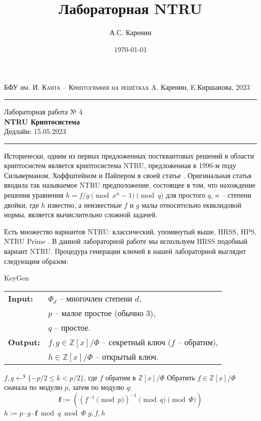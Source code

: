 \documentclass[11pt]{exam}
\author{А.С. Каренин}
\title{Лабораторная NTRU}
\date{\today}
\newcommand{\Z}{\mathbb{Z}}
\begin{document}
	

	
		{\noindent
		\textsc{\small БФУ им. И. Канта -- Криптография на решётках}
		\hfill {A. Каренин, E.Киршанова, 2023}
		\hrule
		\begin{center}
			{\LARGE
				Лабораторная работа № 4 \\[5pt]
				\textbf{
					NTRU Криптосистема
				} \\[10pt]
				{Дедлайн: 15.05.2023} 
			} 
		\end{center}
		\hrule \vspace{5mm}
	
	Исторически, одним из первых предложенных постквантовых решений в области криптосистем является криптосистема NTRU, предложенная в 1996-м поду Сильверманом, Хоффштейном и Пайпером в своей статье \cite{HoffsteinPS98}. Оригинальная статья вводила так называемое NTRU предположение, состоящее в том, что нахождение решения уравнения $h = f/g \pmod{x^n-1} \pmod{q}$ для простого $q$, $n$ -- степени двойки, где $h$ известно, а неизвестные $f$ и $g$ малы относительно еквклидовой нормы, является вычислительно сложной задачей.
	
	Есть множество вариантов NTRU: классический, упомянутый выше, HRSS, HPS, NTRU Prime \cite{schanck2018comparison}. В данной лабораторной работе мы используем HRSS подобный вариант NTRU. Процедура генерации ключей в нашей лабораторной выглядит следующим образом:
	
	  \begin{algorithm}[H] \caption{KeyGen} \label{keygen}
	  	\begin{tabular}{ll}
		\textbf{Input:} & $\Phi_d$  -- многочлен степени $d$,\\
		& $p$ -- малое простое (обычно 3), \\
		& $q$ -- простое.\\
		\textbf{Output:} & $f, g \in \Z[x] / \Phi $ -- секретный ключ ($f$ -- обратим),\\
		& $h \in \Z[x] / \Phi$ -- открытый ключ.
	\end{tabular}
		\begin{algorithmic}[1]
			\State $f, g \leftarrow^\$ \{-p/2 \leqslant k <p/2\}$, где $f$ обратим в $\Z[x] / \Phi $
			\State Обратить $f \in \Z[x]/\Phi$ сначала по модулю $p$, затем по модулю $q$: 
			\[ \mathbf{f} := \left( (f^{-1} \pmod p)^{-1} \pmod{q} \pmod{\Phi} \right)\]
			\State $h := p\cdot g \cdot \mathbf{f}  \bmod q \bmod \Phi$
			\State \Return $g,f,h$
		\end{algorithmic}
	\end{algorithm}
	
}
\end{document}
